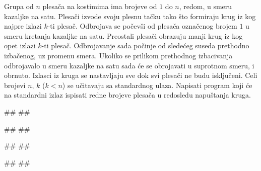 \begin{Exercise}[label=613]
Grupa od $n$ plesača na kostimima ima brojeve od $1$ do $n$, redom, u smeru kazaljke na satu.
Plesači izvode svoju plesnu tačku tako što formiraju krug iz kog najpre izlazi $k$-ti plesač.
Odbrojava se počevši od plesača označenog brojem $1$ u smeru kretanja kazaljke na satu. 
Preostali plesači obrazuju manji krug iz kog opet izlazi $k$-ti plesač. Odbrojavanje sada počinje od
sledećeg suseda prethodno izbačenog, uz promenu smera. Ukoliko se prilikom prethodnog izbacivanja odbrojavalo 
u smeru kazaljke na satu sada će se obrojavati u suprotnom smeru, i obrnuto. Izlasci iz kruga se nastavljaju
sve dok svi plesači ne budu isključeni. 
Celi brojevi $n$, $k$ ($k < n$) se učitavaju sa standardnog ulaza. 
Napisati program koji će na standardni izlaz ispisati redne brojeve plesača u redosledu napuštanja kruga. 

\begin{minitest}
\begin{test}{1}
#\naslovUlaz#
##

#\naslovIzlaz# 
##
\end{test}
\end{minitest}
\begin{minitest}
\begin{test}{2}
#\naslovUlaz#
##

#\naslovIzlaz# 
## 
\end{test}
\end{minitest}
\end{Exercise}
